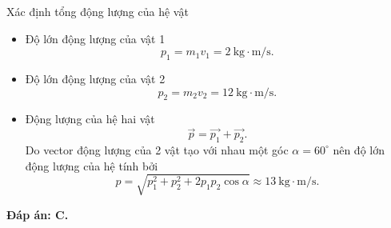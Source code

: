 \begin{dang}{Xác định tổng động lượng của hệ vật}
{{\begin{center}
			\end{center}
			\begin{itemize}
				\item Độ lớn động lượng của vật 1
				\begin{equation*}
					p_1=m_1v_1 =2\ \text{kg} \cdot \text{m/s}. 
				\end{equation*}
				\item Độ lớn động lượng của vật 2
				\begin{equation*}
					p_2=m_2v_2 =12\ \text{kg} \cdot \text{m/s}. 
				\end{equation*}
				\item Động lượng của hệ hai vật 
				\begin{equation*}
					\vec{p}=\vec{p_1}+\vec{p_2}.
				\end{equation*}
				Do vector động lượng của 2 vật tạo với nhau một góc $\alpha = 60^\circ$ nên độ lớn động lượng của hệ tính bởi 
				\begin{equation*}
					p= \sqrt{p_1^2+p_2^2 +2p_1p_2\cos \alpha}\approx 13\ \text{kg} \cdot \text{m/s}.
				\end{equation*}
			\end{itemize}
			\textbf{Đáp án: C.}}
	}
\end{dang}
